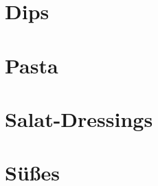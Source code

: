 \documentclass[
  DIV=11,%
  pagesize,%
  fontsize=11pt,%
  paper=a4,%
  numbers=noenddot,
]{scrartcl}
\begin{document}
\section{Dips}
\newpage

\section{Pasta}
\newpage
\newpage

\section{Salat-Dressings}
\newpage

\section{Süßes}
\newpage
\newpage
\newpage
\newpage
\newpage
\newpage
\end{document}
